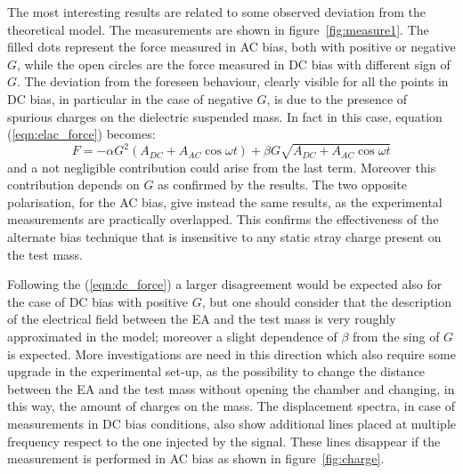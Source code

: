 The most interesting results are related to some observed deviation from the theoretical model. The measurements are shown in figure~\ref{fig:measure1}. The filled dots represent the force measured in AC bias, both with positive or negative $G$, while the open circles are the force measured in DC bias with different sign of $G$. The deviation from the foreseen behaviour, clearly visible for all the points in DC bias, in particular in the case of negative $G$, is due to the presence of spurious charges on the dielectric suspended mass. In fact in this case, equation (\ref{eqn:elac_force}) becomes:
\begin{equation}
\label{eqn:dc_force}
F=-\alpha G^2\left( A_{DC}+A_{AC}\cos{\omega t}\right)+\beta G \sqrt{A_{DC}+A_{AC}\cos{\omega t}}
\end{equation}
and a not negligible contribution could arise from the last term. Moreover this contribution depends on $G$ as confirmed by the results. The two opposite polarisation, for the AC bias, give instead the same results, as the experimental measurements are practically overlapped. This confirms the effectiveness of the alternate bias technique that is insensitive to any static stray charge present on the test mass.

Following the (\ref{eqn:dc_force}) a larger disagreement would be expected also for the case of DC bias with positive $G$, but  one should consider that the description of the electrical field between the EA and the test mass is very roughly approximated in the model; moreover a slight dependence of $\beta$ from the sing of $G$ is expected. More investigations are need in this direction which also require some upgrade in the experimental set-up, as the possibility to change the distance between the EA and the test mass without opening the chamber and changing, in this way, the amount of charges on the mass.
The displacement spectra, in case of measurements in DC bias conditions, also show additional lines placed at multiple frequency respect to the one injected by the signal. These lines disappear if the measurement is performed in AC bias as shown in figure~\ref{fig:charge}.

